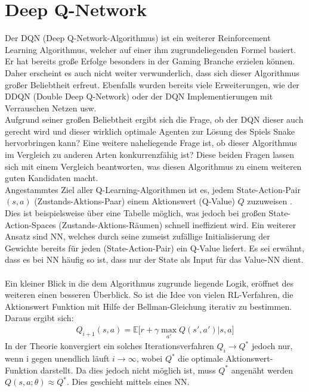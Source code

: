 \section{Deep Q-Network} \label{sec:Q-Learning}
Der DQN (Deep Q-Network-Algorithmus) ist ein weiterer Reinforcement Learning Algorithmus, welcher auf einer ihm zugrundeliegenden Formel basiert. Er hat bereits große Erfolge besonders in der Gaming Branche erzielen können. Daher erscheint es auch nicht weiter verwunderlich, dass sich dieser Algorithmus großer Beliebtheit erfreut. Ebenfalls wurden bereits viele Erweiterungen, wie der DDQN (Double Deep Q-Network) oder der DQN Implementierungen mit Verrauschen Netzen usw.\\
Aufgrund seiner großen Beliebtheit ergibt sich die Frage, ob der DQN dieser auch gerecht wird und dieser wirklich optimale Agenten zur Lösung des Spiels Snake hervorbringen kann? Eine weitere naheliegende Frage ist, ob dieser Algorithmus im Vergleich zu anderen Arten konkurrenzfähig ist? Diese beiden Fragen lassen sich mit einem Vergleich beantworten, was diesen Algorithmus zu einem weiteren guten Kandidaten macht.\\ 
Angestammtes Ziel aller Q-Learning-Algorithmen ist es, jedem State-Action-Pair $(s,a)$ (Zustands-Aktions-Paar) einem Aktionswert (Q-Value) $Q$ zuzuweisen \cite[S. 126]{DRL_Lapan}. Dies ist beispielsweise über eine Tabelle möglich, was jedoch bei großen State-Action-Spaces (Zustands-Aktions-Räumen) schnell ineffizient wird. Ein weiterer Ansatz sind NN, welches durch seine zumeist zufällige Initialisierung der Gewichte bereits für jeden (State-Action-Pair) ein Q-Value liefert. Es sei erwähnt, dass es bei NN häufig so ist, dass nur der State als Input für das Value-NN dient.\\
\\Ein kleiner Blick in die dem Algorithmus zugrunde liegende Logik, eröffnet des weiteren einen besseren Überblick. So ist die Idee von vielen RL-Verfahren, die Aktionswert Funktion mit Hilfe der Bellman-Gleichung iterativ zu bestimmen. Daraus ergibt sich:
\begin{align}
	Q_{i+1}(s,a) = \mathbb{E} \bigl\lbrack r + \gamma \max_{a'} Q(s',a')|s,a \bigr\rbrack
\end{align}
In der Theorie konvergiert ein solches Iterationsverfahren $Q_i \longrightarrow Q^*$ jedoch nur, wenn i gegen unendlich läuft $i \longrightarrow \infty$, wobei $Q^*$ die optimale Aktionswert-Funktion darstellt. Da dies jedoch nicht möglich ist, muss $Q^*$ angenäht werden $Q(s,a;\theta) \approx Q^* $. Dies geschieht mittels eines NN.\\
